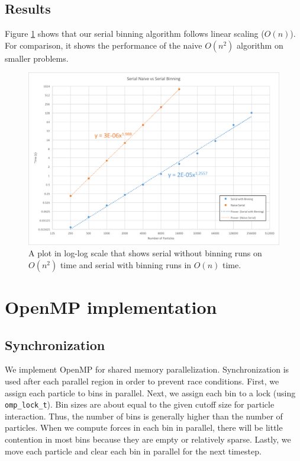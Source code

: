 \documentclass[12pt]{article}
\begin{document}
\subsection{Results}
Figure \ref{fig:serial-on} shows that our serial binning algorithm follows linear scaling ($O(n)$). For comparison, it shows the performance of the naive $O(n^2)$ algorithm on smaller problems.

\begin{figure}
	\centering
 \includegraphics[width=\textwidth]{graphs/serial_binning_vs_naive.png}
  \caption{A plot in log-log scale that shows serial without binning runs on $O(n^2)$ time and serial with binning runs in $O(n)$ time.}
  \label{fig:serial-on}
\end{figure}

\section{OpenMP implementation}

\subsection{Synchronization}

We implement OpenMP for shared memory parallelization. Synchronization is used after each parallel region in order to prevent race conditions. First, we assign each particle to bins in parallel. Next, we assign each bin to a lock (using \texttt{omp\_lock\_t}). Bin sizes are about equal to the given cutoff size for particle interaction. Thus, the number of bins is generally higher than the number of particles. When we compute forces in each bin in parallel, there will be little contention in most bins because they are empty or relatively sparse. Lastly, we move each particle and clear each bin in parallel for the next timestep. 
\end{document}
